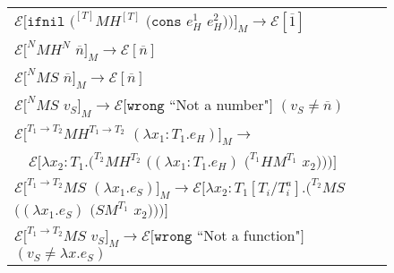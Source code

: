 \begin{figure}[p]
\centering
\begin{tabular}{l}

\vspace{5pt}

$\mathscr{E}[\mathtt{ifnil}$ $(^{[T]}MH^{[T]}$ $(\mathtt{cons}$ $e_{H}^{1}$ $e_{H}^{2}))]_{M}\rightarrow\mathscr{E}[\overline{1}]$ \\

\vspace{5pt}

$\mathscr{E}[^{N}MH^{N}$ $\overline{n}]_{M}\rightarrow\mathscr{E}[\overline{n}]$ \\

\vspace{5pt}

$\mathscr{E}[^{N}MS$ $\overline{n}]_{M}\rightarrow\mathscr{E}[\overline{n}]$ \\

\vspace{5pt}

$\mathscr{E}[^{N}MS$ $v_{S}]_{M}\rightarrow\mathscr{E}[\mathtt{wrong}$ ``Not a number"$]$ $(v_{S}\neq\overline{n})$ \\

\vspace{5pt}

$\mathscr{E}[^{T_{1}\rightarrow T_{2}}MH^{T_{1}\rightarrow T_{2}}$ $(\lambda x_{1}:T_{1}.e_{H})]_{M}\rightarrow$ \\

\vspace{5pt}

$\quad\mathscr{E}[\lambda x_{2}:T_{1}.(^{T_{2}}MH^{T_{2}}$ $((\lambda x_{1}:T_{1}.e_{H})$ $(^{T_{1}}HM^{T_{1}}$ $x_{2})))]$ \\

\vspace{5pt}

$\mathscr{E}[^{T_{1}\rightarrow T_{2}}MS$ $(\lambda x_{1}.e_{S})]_{M}\rightarrow\mathscr{E}[\lambda x_{2}:T_{1}[T_{i}/T^{a}_{i}].(^{T_{2}}MS$ $((\lambda x_{1}.e_{S})$ $(SM^{T_{1}}$ $x_{2})))]$ \\

\vspace{5pt}

$\mathscr{E}[^{T_{1}\rightarrow T_{2}}MS$ $v_{S}]_{M}\rightarrow\mathscr{E}[\mathtt{wrong}$ ``Not a function"$]$ $(v_{S}\neq\lambda x.e_{S})$ \\


\end{tabular}
\end{figure}
